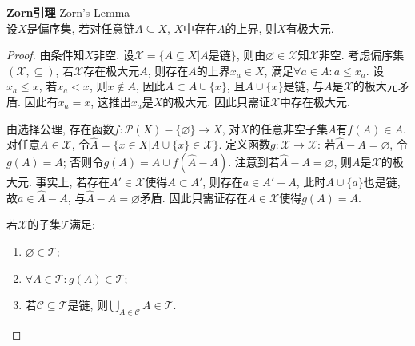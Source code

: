 \begin{thm} \textbf{Zorn引理} Zorn's Lemma\\
设$X$是偏序集, 若对任意链$A\subseteq X$, $X$中存在$A$的上界, 则$X$有极大元. 
\end{thm}
\begin{proof}
\par 由条件知$X$非空. 设$\mathcal{X}=\{A\subseteq X| A\text{是链}\}$, 则由$\varnothing\in \mathcal{X}$知$\mathcal{X}$非空. 考虑偏序集$(\mathcal{X}, \subseteq)$, 若$\mathcal{X}$存在极大元$A$, 则存在$A$的上界$x_a\in X$, 满足$\forall a\in A: a\le x_a$. 设$x_a\le x$, 若$x_a < x$, 则$x\notin A$, 因此$A\subset A\cup \{x\}$, 且$A\cup \{x\}$是链, 与$A$是$\mathcal{X}$的极大元矛盾. 因此有$x_a=x$, 这推出$x_a$是$X$的极大元. 因此只需证$\mathcal{X}$中存在极大元. 
\par 由选择公理, 存在函数$f:\mathcal{P}(X)-\{\varnothing\}\to X$, 对$X$的任意非空子集$A$有$f(A)\in A$. 对任意$A\in \mathcal{X}$, 令$\hat{A}=\{x\in X\vert A\cup \{x\} \in \mathcal{X}\}$. 定义函数$g:\mathcal{X}\to \mathcal{X}$: 若$\hat{A}-A=\varnothing$, 令$g(A)=A$; 否则令$g(A)=A\cup f(\hat{A}-A)$. 注意到若$\hat{A}-A=\varnothing$, 则$A$是$\mathcal{X}$的极大元. 事实上, 若存在$A'\in \mathcal{X}$使得$A\subset A'$, 则存在$a\in A'-A$, 此时$A\cup \{a\}$也是链, 故$a\in \hat{A}-A$, 与$\hat{A}-A=\varnothing$矛盾. 因此只需证存在$A\in \mathcal{X}$使得$g(A)=A$. 
\par 若$\mathcal{X}$的子集$\mathcal{T}$满足:
\begin{enumerate}
    \item $\varnothing\in \mathcal{T}$;
    \item $\forall A\in \mathcal{T}: g(A)\in \mathcal{T}$;
    \item 若$\mathcal{C} \subseteq \mathcal{T}$是链, 则$\bigcup_{A\in \mathcal{C}} A \in \mathcal{T}$.
\end{enumerate}

\end{proof}
